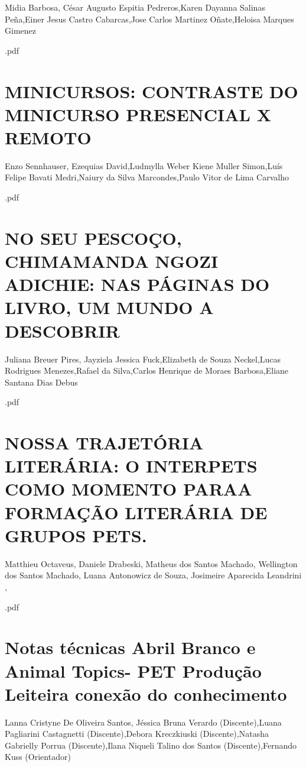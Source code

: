 Midia Barbosa, César Augusto Espitia Pedreros,Karen Dayanna Salinas Peña,Einer Jesus Castro Cabarcas,Jose Carlos Martinez Oñate,Heloisa Marques Gimenez



.pdf\section{MINICURSOS: CONTRASTE DO MINICURSO PRESENCIAL X REMOTO}

Enzo Sennhauser, Ezequias David,Ludmylla Weber Kiene Muller Simon,Luís Felipe Bavati Medri,Naiury da Silva Marcondes,Paulo Vitor de Lima Carvalho



.pdf\section{NO SEU PESCOÇO, CHIMAMANDA NGOZI ADICHIE: NAS PÁGINAS DO LIVRO, UM  MUNDO A DESCOBRIR}

Juliana Breuer Pires, Jayziela Jessica Fuck,Elizabeth de  Souza Neckel,Lucas Rodrigues Menezes,Rafael da Silva,Carlos Henrique de Moraes Barbosa,Eliane Santana Dias Debus



.pdf\section{NOSSA TRAJETÓRIA LITERÁRIA: O INTERPETS COMO MOMENTO PARAA FORMAÇÃO LITERÁRIA DE GRUPOS PETS.}

Matthieu Octaveus, Daniele Drabeski, Matheus dos Santos Machado, Wellington dos Santos Machado, Luana Antonowicz de Souza, Josimeire Aparecida Leandrini ,



.pdf\section{Notas técnicas Abril Branco  e Animal Topics- PET Produção Leiteira conexão do conhecimento}

Lanna Cristyne De Oliveira Santos, Jéssica Bruna Verardo (Discente),Luana Pagliarini Castagnetti (Discente),Debora Kreczkiuski (Discente),Natasha Gabrielly Porrua (Discente),Ilana Niqueli Talino dos Santos (Discente),Fernando Kuss (Orientador)

